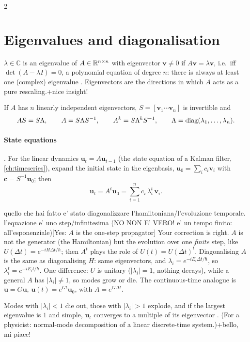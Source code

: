\begin{paracol}{2}
\section{Eigenvalues and diagonalisation}\label{sec:eigen}
$\lambda\in\mathbb C$ is an eigenvalue of $A\in\mathbb{R}^{n\times n}$ with eigenvector $\bm v\neq0$ if
$A\bm v=\lambda\bm v$, i.e.\ iff $\det(A-\lambda I)=0$, a polynomial equation of degree $n$: there is
always at least one (complex) eigenvalue . Eigenvectors are the directions in which $A$
acts as a pure rescaling.\note+{nice insight!}

If $A$ has $n$ linearly independent eigenvectors, $S=[\bm v_1\cdots\bm v_n]$ is invertible and
\[
  AS=S\Lambda,\qquad A=S\Lambda S^{-1},\qquad A^k=S\Lambda^kS^{-1},\qquad \Lambda=\operatorname{diag}(\lambda_1,\dots,\lambda_n).
\]
\paragraph{State equations} . For the linear dynamics $\bm u_t=A\bm u_{t-1}$ (the state
equation of a Kalman filter, \cref{ch:timeseries}), expand the initial state in the eigenbasis,
$\bm u_0=\sum_ic_i\bm v_i$ with $\bm c=S^{-1}\bm u_0$; then
\[
  \bm u_t = A^t\bm u_0 = \sum_{i=1}^n c_i\,\lambda_i^t\,\bm v_i .
\]\begin{answer}{quello che hai fatto e' stato diagonalizzare l'hamiltoniana/l'evoluzione temporale. l'equazione e' uno step/infinitesima (NO NON E' VERO! e' un tempo finito: all'esponenziale)}[Yes: $A$ is the one-step propagator]
Your correction is right. $A$ is not the generator (the Hamiltonian) but the evolution over one
\emph{finite} step, like $U(\Delta t)=e^{-iH\Delta t/\hbar}$; then $A^t$ plays the role of $U(t)=U(\Delta t)^t$.
Diagonalising $A$ is the same as diagonalising $H$: same eigenvectors, and $\lambda_i=e^{-iE_i\Delta t/\hbar}$, so
$\lambda_i^t=e^{-iE_it/\hbar}$. One difference: $U$ is unitary ($|\lambda_i|=1$, nothing decays), while a general
$A$ has $|\lambda_i|\ne1$, so modes grow or die. The continuous-time analogue is $\dot{\bm u}=G\bm u$,
$\bm u(t)=e^{Gt}\bm u_0$, with $A=e^{G\Delta t}$.
\end{answer}
Modes with $|\lambda_i|<1$ die out, those with $|\lambda_i|>1$ explode, and if the largest eigenvalue is
$1$ and simple, $\bm u_t$ converges to a multiple of its eigenvector . (For a physicist:
normal-mode decomposition of a linear discrete-time system.)\note+{bello, mi piace!}


\end{paracol}
